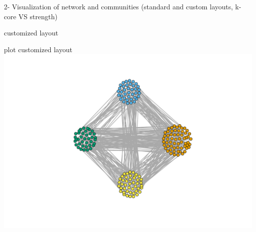 \documentclass[
  ignorenonframetext,
]{beamer}
\begin{document}
\begin{frame}[fragile]{2- Visualization of network and communities
(standard and custom layouts, k-core VS strength)}
\begin{block}{customized layout}
\protect\hypertarget{customized-layout}{}
\end{block}

\begin{block}{plot customized layout}
\protect\hypertarget{plot-customized-layout}{}
\includegraphics{presentation1_files/figure-beamer/unnamed-chunk-13-1.pdf}
\end{block}
\end{frame}
\end{document}
